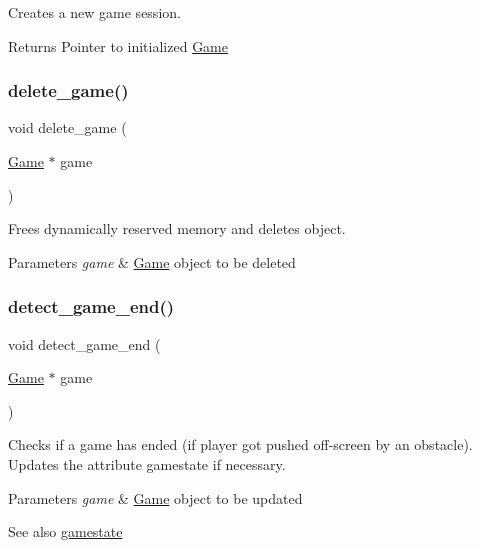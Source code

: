 Creates a new game session. 

\begin{DoxyReturn}{Returns}
Pointer to initialized \hyperlink{struct_game}{Game} 
\end{DoxyReturn}
\hypertarget{group__game_ga11217e4d270598c9ab99d632d090b942}{}\label{group__game_ga11217e4d270598c9ab99d632d090b942} 
\subsubsection{\texorpdfstring{delete\+\_\+game()}{delete\_game()}}
{\footnotesize\ttfamily void delete\+\_\+game (\begin{DoxyParamCaption}\item[{\hyperlink{struct_game}{Game} $\ast$}]{game }\end{DoxyParamCaption})}



Frees dynamically reserved memory and deletes \textquotesingle{}object\textquotesingle{}. 


\begin{DoxyParams}{Parameters}
{\em game} & \hyperlink{struct_game}{Game} \textquotesingle{}object\textquotesingle{} to be deleted \\
\hline
\end{DoxyParams}
\hypertarget{group__game_ga6d509d99fcf7deead2ccb896bfce5b78}{}\label{group__game_ga6d509d99fcf7deead2ccb896bfce5b78} 
\subsubsection{\texorpdfstring{detect\+\_\+game\+\_\+end()}{detect\_game\_end()}}
{\footnotesize\ttfamily void detect\+\_\+game\+\_\+end (\begin{DoxyParamCaption}\item[{\hyperlink{struct_game}{Game} $\ast$}]{game }\end{DoxyParamCaption})}



Checks if a game has ended (if player got pushed off-\/screen by an obstacle). Updates the attribute gamestate if necessary. 


\begin{DoxyParams}{Parameters}
{\em game} & \hyperlink{struct_game}{Game} \textquotesingle{}object\textquotesingle{} to be updated \\
\hline
\end{DoxyParams}
\begin{DoxySeeAlso}{See also}
\hyperlink{group__game_ga33d4db650f69082296cc8c864c785e15}{gamestate} 
\end{DoxySeeAlso}
\hypertarget{group__game_ga419536b6c803dd698c45680932477690}{}\label{group__game_ga419536b6c803dd698c45680932477690} 
